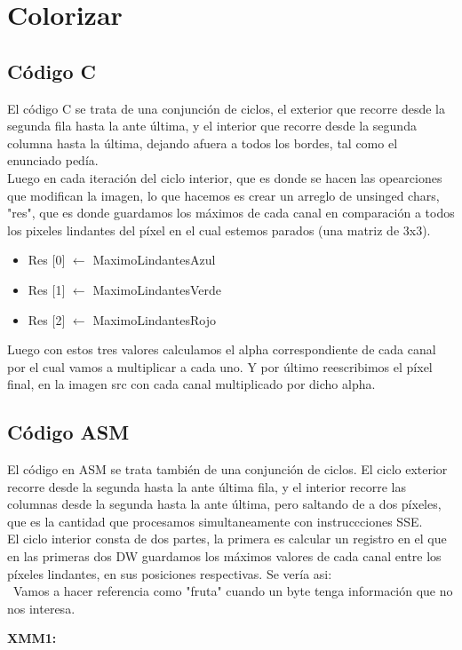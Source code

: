 \section{Colorizar}

\subsection{Código C}
	El código C se trata de una conjunción de ciclos, el exterior que recorre desde la segunda fila hasta la ante última,  y el interior que recorre desde la segunda columna hasta la última, dejando afuera a todos los bordes, tal como el enunciado pedía. \\ Luego en cada iteración del ciclo interior, que es donde se hacen las opearciones que modifican la imagen, lo que hacemos es crear un arreglo de unsinged chars, "res", que es  donde guardamos los máximos de cada canal en comparación a todos  los pixeles lindantes del píxel en el cual estemos parados (una matriz de 3x3).
\begin{itemize}
\item {Res $[$0$]$ $\leftarrow$ MaximoLindantesAzul}
\item {Res $[$1$]$ $\leftarrow$ MaximoLindantesVerde}
\item {Res $[$2$]$ $\leftarrow$ MaximoLindantesRojo}
\end{itemize}
Luego con estos tres valores calculamos el alpha correspondiente de cada canal por el cual vamos a multiplicar a cada uno. Y por último reescribimos el píxel final, en la imagen src con cada canal multiplicado por dicho alpha.

\subsection{Código ASM}
	El código en ASM se trata también de una conjunción de ciclos. El ciclo exterior recorre desde la segunda hasta la ante última fila, y el interior recorre las columnas desde la segunda hasta la ante última, pero saltando de a dos píxeles, que es la cantidad que procesamos simultaneamente con instruccciones SSE. \\
	El ciclo interior consta de dos partes, la primera es calcular un registro en el que en las primeras dos DW guardamos los máximos valores de cada canal entre los píxeles lindantes, en sus posiciones respectivas. Se vería asi:\\
\ Vamos a hacer referencia como "fruta" cuando un byte tenga información que no nos interesa.
\par{\textbf{XMM1:}}
	
